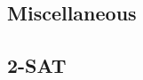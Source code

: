 \documentclass[12pt]{extarticle}
\begin{document}
\begin{multicols*}{2}
\section{Miscellaneous}
\subsection{2-SAT} %


\end{multicols*}
\end{document}
